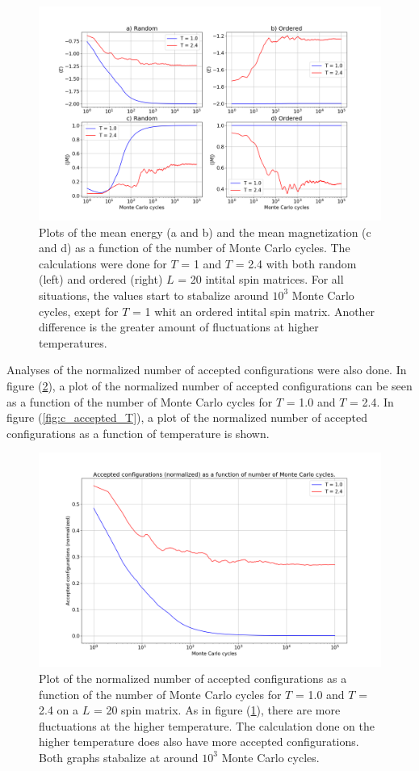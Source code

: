 \documentclass[10pt,a4paper,titlepage]{article}
\begin{document}
\begin{figure}[]
\centering
\centering\includegraphics[scale=0.3]{taskc_1.png}
\caption{Plots of the mean energy (a and b) and the mean magnetization (c and d) as a function of the number of Monte Carlo cycles. The calculations were done for $T$ = 1 and $T$ = 2.4 with both random (left) and ordered (right) $L$ = 20 intital spin matrices. For all situations, the values start to stabalize around $10^3$ Monte Carlo cycles, exept for $T$ = 1 whit an ordered intital spin matrix. Another difference is the greater amount of fluctuations at higher temperatures.    \label{fig:c_thermal}}
\end{figure}

Analyses of the normalized number of accepted configurations were also done. In figure (\ref{fig:c_accepted_MCC}), a plot of the normalized number of accepted configurations can be seen as a function of the number of Monte Carlo cycles for $T$ = 1.0 and $T$ = 2.4. In figure (\ref{fig:c_accepted_T}), a plot of the normalized number of accepted configurations as a function of temperature is shown.

\begin{figure}[]
\centering
\centering\includegraphics[scale=0.3]{taskc_2.png}
\caption{Plot of the normalized number of accepted configurations as a function of the number of Monte Carlo cycles for $T$ = 1.0 and $T$ = 2.4 on a $L$ = 20 spin matrix. As in figure (\ref{fig:c_thermal}), there are more fluctuations at the higher temperature. The calculation done on the higher temperature does also have more accepted configurations. Both graphs stabalize at around $10^3$ Monte Carlo cycles.  \label{fig:c_accepted_MCC}}
\end{figure}
\end{document}

